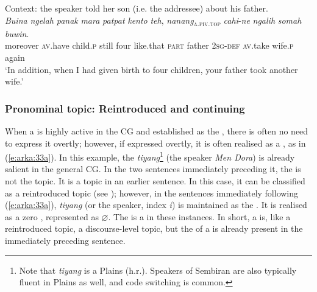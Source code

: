 \documentclass[output=paper
,modfonts
,nonflat]{langsci/langscibook}
\begin{document}
\begin{exe}
	\ex\label{e:arka:32}{Context: the speaker told her son (i.e. the addressee) about his father.}\\
	\gll \textit{Buina} \textit{ngelah} \textit{panak} \textit{mara} \textit{patpat} \textit{kento} \textit{teh}, {\ob}\textit{nanang}{\cb}\textsc{\textsubscript{a.piv.top}} \textit{cahi}-\textit{ne} \textit{ngalih} \textit{somah} \textit{buwin}.\\
	moreover \textsc{av}.have child.\textsc{p} still four like.that  \textsc{part} \phantom{[}father 2\textsc{sg}-\textsc{def}   \textsc{av}.take wife.\textsc{p} again\\
	\glt ‘In addition, when I had given birth to four children, your father took another wife.’
\end{exe}

\subsubsection{{Pronominal topic: Reintroduced and continuing}}

When a  is highly active in the CG and established as the , there is often no need to express it overtly; however, if expressed overtly, it is often realised as a , as in (\ref{e:arka:33a}). In this example, the  \textit{tiyang}\footnote{Note that \textit{tiyang} is a Plains   (h.r.). Speakers of Sembiran  are also typically fluent in Plains  as well, and code switching is common.}  (the speaker \textit{Men Dora}) is already salient in the general CG. In the two sentences immediately preceding it, the  is not the topic. It is a topic in an earlier sentence. In this case, it can be classified as a reintroduced topic (see ); however, in the sentences immediately following (\ref{e:arka:33a}), \textit{tiyang} (or the speaker, index \textit{i}) is maintained as the . It is realised as a zero , represented as ${\varnothing}$. The  is a  in these instances. In short, a  is, like a reintroduced topic, a discourse-level topic, but the  of a  is already present in the immediately preceding sentence.
\end{document}
